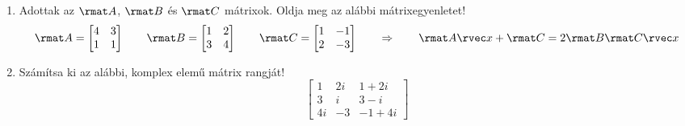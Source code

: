 \documentclass[a4paper, 12pt]{scrartcl}
\begin{document}
\begin{enumerate}
  \item Adottak az $\rmat A$, $\rmat B$ és $\rmat C$ mátrixok. Oldja meg az
        alábbi mátrixegyenletet!
        $$
          \rmat A = \begin{bmatrix}
            4 & 3 \\
            1 & 1
          \end{bmatrix}
          \qquad
          \rmat B = \begin{bmatrix}
            1 & 2 \\
            3 & 4
          \end{bmatrix}
          \qquad
          \rmat C = \begin{bmatrix}
            1 & -1 \\
            2 & -3
          \end{bmatrix}
          \qquad \Rightarrow \qquad
          \rmat A \rvec x + \rmat C = 2\rmat B \rmat C \rvec x
        $$

  \item Számítsa ki az alábbi, komplex elemű mátrix rangját!
        $$
          \begin{bmatrix}
            1  & 2i & 1+2i    \\
            3  & i  & 3-i     \\
            4i & -3 & -1 + 4i
          \end{bmatrix}
        $$
\end{enumerate}
\end{document}
